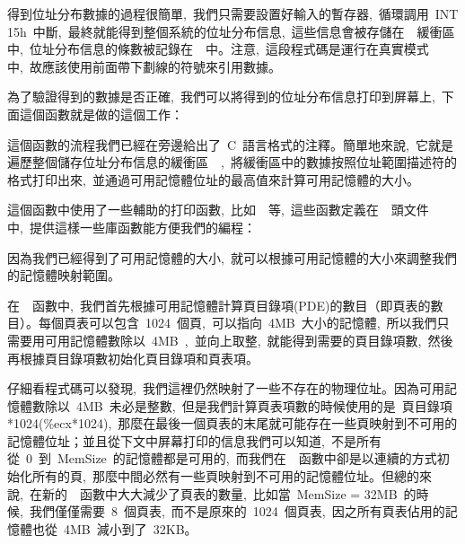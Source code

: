 得到位址分布數據的過程很簡單,~我們只需要設置好輸入的暫存器,~循環調用~INT 15h~中斷,~最終就能得到整個系統的位址分布信息,~這些信息會被存儲在~~緩衝區中,~位址分布信息的條數被記錄在~~中。注意,~這段程式碼是運行在真實模式中,~故應該使用前面帶下劃線的符號來引用數據。

為了驗證得到的數據是否正確,~我們可以將得到的位址分布信息打印到屏幕上,~下面這個函數就是做的這個工作：


這個函數的流程我們已經在旁邊給出了~C~語言格式的注釋。簡單地來說,~它就是遍歷整個儲存位址分布信息的緩衝區~~,~將緩衝區中的數據按照位址範圍描述符的格式打印出來,~並通過可用記憶體位址的最高值來計算可用記憶體的大小。

這個函數中使用了一些輔助的打印函數,~比如~~等,~這些函數定義在~~頭文件中,~提供這樣一些庫函數能方便我們的編程：


因為我們已經得到了可用記憶體的大小,~就可以根據可用記憶體的大小來調整我們的記憶體映射範圍。


在~~函數中,~我們首先根據可用記憶體計算頁目錄項(PDE)的數目（即頁表的數目）。每個頁表可以包含~1024~個頁,~可以指向~4MB~大小的記憶體,~所以我們只需要用可用記憶體數除以~4MB~,~並向上取整,~就能得到需要的頁目錄項數,~然後再根據頁目錄項數初始化頁目錄項和頁表項。

仔細看程式碼可以發現,~我們這裡仍然映射了一些不存在的物理位址。因為可用記憶體數除以~4MB~未必是整數,~但是我們計算頁表項數的時候使用的是~頁目錄項*1024(\%ecx*1024),~那麼在最後一個頁表的末尾就可能存在一些頁映射到不可用的記憶體位址；並且從下文中屏幕打印的信息我們可以知道,~不是所有從~0~到~MemSize~的記憶體都是可用的,~而我們在~~函數中卻是以連續的方式初始化所有的頁,~那麼中間必然有一些頁映射到不可用的記憶體位址。但總的來說,~在新的~~函數中大大減少了頁表的數量,~比如當~MemSize = 32MB~的時候,~我們僅僅需要~8~個頁表,~而不是原來的~1024~個頁表,~因之所有頁表佔用的記憶體也從~4MB~減小到了~32KB。

